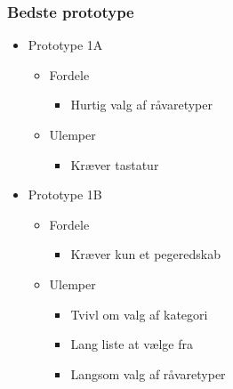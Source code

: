 \begin{frame}
\frametitle{Bedste prototype}
	\begin{itemize}
	\item Prototype 1A
			\begin{itemize}
			\item Fordele
				\begin{itemize}
				\item Hurtig valg af råvaretyper
				\end{itemize}
			\item Ulemper
				\begin{itemize}
				\item Kræver tastatur
				\end{itemize}
			\end{itemize}
	\item Prototype 1B
			\begin{itemize}
			\item Fordele
				\begin{itemize}
				\item Kræver kun et pegeredskab
				\end{itemize}
			\item Ulemper
				\begin{itemize}
				\item Tvivl om valg af kategori
				\item Lang liste at vælge fra
				\item Langsom valg af råvaretyper
				\end{itemize}
			\end{itemize} 
	\end{itemize}
	
\end{frame}

